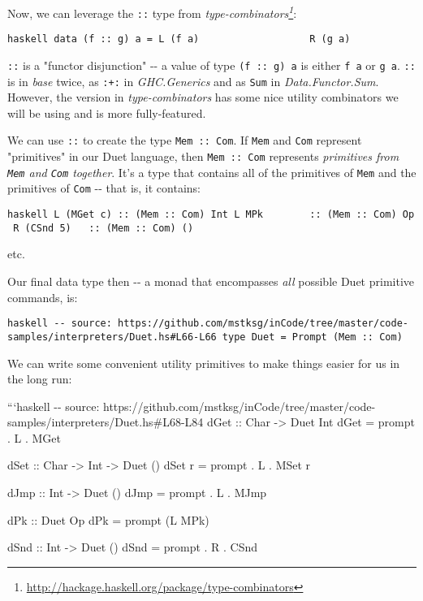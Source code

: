 \documentclass[]{article}
\renewcommand{\href}[2]{#2\footnote{\url{#1}}}
\begin{document}
Now, we can leverage the \texttt{:\textbar{}:} type from
\emph{\href{http://hackage.haskell.org/package/type-combinators}{type-combinators}}:

\texttt{haskell\ data\ (f\ :\textbar{}:\ g)\ a\ =\ L\ (f\ a)\ \ \ \ \ \ \ \ \ \ \ \ \ \ \ \ \ \ \textbar{}\ R\ (g\ a)}

\texttt{:\textbar{}:} is a "functor disjunction" -\/- a value of type
\texttt{(f\ :\textbar{}:\ g)\ a} is either \texttt{f\ a} or \texttt{g\ a}.
\texttt{:\textbar{}:} is in \emph{base} twice, as \texttt{:+:} in
\emph{GHC.Generics} and as \texttt{Sum} in \emph{Data.Functor.Sum}. However, the
version in \emph{type-combinators} has some nice utility combinators we will be
using and is more fully-featured.

We can use \texttt{:\textbar{}:} to create the type
\texttt{Mem\ :\textbar{}:\ Com}. If \texttt{Mem} and \texttt{Com} represent
"primitives" in our Duet language, then \texttt{Mem\ :\textbar{}:\ Com}
represents \emph{primitives from \texttt{Mem} and \texttt{Com} together}. It's a
type that contains all of the primitives of \texttt{Mem} and the primitives of
\texttt{Com} -\/- that is, it contains:

\texttt{haskell\ L\ (MGet\ \textquotesingle{}c\textquotesingle{})\ ::\ (Mem\ :\textbar{}:\ Com)\ Int\ L\ MPk\ \ \ \ \ \ \ \ ::\ (Mem\ :\textbar{}:\ Com)\ Op\ R\ (CSnd\ 5)\ \ \ ::\ (Mem\ :\textbar{}:\ Com)\ ()}

etc.

Our final data type then -\/- a monad that encompasses \emph{all} possible Duet
primitive commands, is:

\texttt{haskell\ -\/-\ source:\ https://github.com/mstksg/inCode/tree/master/code-samples/interpreters/Duet.hs\#L66-L66\ type\ Duet\ =\ Prompt\ (Mem\ :\textbar{}:\ Com)}

We can write some convenient utility primitives to make things easier for us in
the long run:

```haskell -\/- source:
https://github.com/mstksg/inCode/tree/master/code-samples/interpreters/Duet.hs\#L68-L84
dGet :: Char -\textgreater{} Duet Int dGet = prompt . L . MGet

dSet :: Char -\textgreater{} Int -\textgreater{} Duet () dSet r = prompt . L .
MSet r

dJmp :: Int -\textgreater{} Duet () dJmp = prompt . L . MJmp

dPk :: Duet Op dPk = prompt (L MPk)

dSnd :: Int -\textgreater{} Duet () dSnd = prompt . R . CSnd
\end{document}
